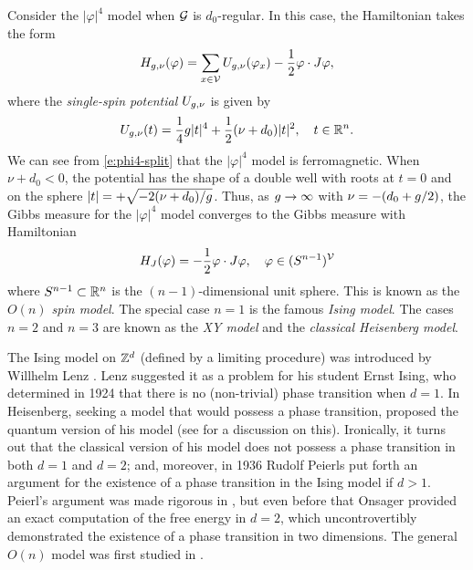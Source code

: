 Consider the $|\varphi|^4$ model when $\mathcal{G}$ is $d_0$-regular. In this case,
the Hamiltonian takes the form
\begin{equation}
\label{e:phi4-split}
H_{g,\nu}(\varphi)
  =
\sum_{x\in\mathcal{V}} U_{g,\nu}(\varphi_x) - \frac{1}{2} \varphi \cdot J \varphi,
\end{equation}
where the \emph{single-spin potential} $U_{g,\nu}$ is given by
\begin{equation}
U_{g,\nu}(t)
	=
\frac{1}{4} g |t|^4
	+
\frac{1}{2} (\nu + d_0) |t|^2,
	\quad
t \in {\mathbb R}^n.
\end{equation}
We can see from \eqref{e:phi4-split} that the $|\varphi|^4$ model is ferromagnetic.
When $\nu + d_0 < 0$, the potential has the shape of a double well with roots at
$t = 0$ and on the sphere $|t| = +\sqrt{-2 (\nu + d_0) / g}$.
Thus, as $g\rightarrow\infty$ with $\nu = -(d_0 + g/2)$, the Gibbs measure for the
$|\varphi|^4$ model converges to the Gibbs measure with Hamiltonian
\begin{equation}
\label{e:on-model}
H_J(\varphi) = -\frac12 \varphi \cdot J \varphi,
	\quad
\varphi \in (S^{n-1})^{\mathcal{V}}
\end{equation}
where $S^{n-1} \subset {\mathbb R}^n$ is the $(n-1)$-dimensional unit sphere.
This is known as the \emph{$O(n)$ spin model}. The special case $n = 1$ is the
famous \emph{Ising model}. The cases $n = 2$ and $n = 3$ are known as the
\emph{XY model} and the \emph{classical Heisenberg model}.

\begin{rk}
The Ising model on ${ {{\mathbb Z}}^d }$ (defined by a limiting procedure) was introduced
by Willhelm Lenz \cite{Lenz20}. Lenz
suggested it as a problem for his student Ernst Ising, who determined in 1924
\cite{Ising25} that there is no (non-trivial) phase transition when $d = 1$.
In \cite{Heisenberg28} Heisenberg, seeking a model that would possess a phase transition,
proposed the quantum version of his model (see \cite{Brush67} for a discussion on this).
Ironically, it turns out that the classical version of his model does not possess a phase
transition in both $d = 1$ and $d = 2$; and, moreover, in 1936
Rudolf Peierls \cite{Peierls36} put forth an argument for the existence of a phase transition
in the Ising model if $d > 1$. Peierl's argument was made rigorous in \cite{Griffiths64},
but even before that Onsager \cite{Onsager44} provided an exact computation of the
free energy in $d = 2$, which uncontrovertibly demonstrated the existence of a
phase transition in two dimensions.
The general $O(n)$ model was first studied in \cite{Stanley68}.
\end{rk}


